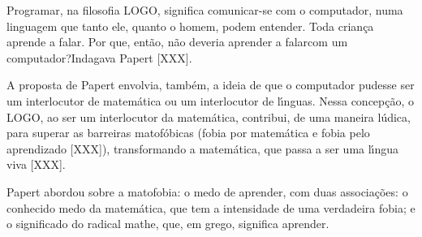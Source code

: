 \documentclass[
12pt,		%
openright,	%
twoside,  %
a4paper,			%
chapter=TITLE,		%
english,			%
french,				%
spanish,			%
brazil				%
]{USPSC-classe/USPSC_RedarTex}
\begin{document}
Programar, na filosofia LOGO, significa \textquotedbl comunicar-se com o computador, numa linguagem que tanto ele, quanto o homem,  podem entender\textquotedbl . Toda crian\c{c}a aprende a falar. Por que, ent\~ao, n\~ao deveria aprender a \textquotedbl falar\textquotedbl  com um computador?\textquotedbl  Indagava Papert [XXX].








A proposta de Papert envolvia, tamb\'em, a ideia de que o computador pudesse ser um interlocutor  de matem\'atica ou um interlocutor de l\'{\i}nguas. Nessa concep\c{c}\~ao, o LOGO, ao ser um interlocutor da matem\'atica, contribui, de uma maneira l\'udica, para superar as barreiras matof\'obicas (fobia por matem\'atica e fobia pelo aprendizado [XXX]), transformando a matem\'atica, que passa a ser uma l\'{\i}ngua viva [XXX].








Papert abordou sobre a \textquotedbl matofobia: o medo de aprender\textquotedbl , com duas associa\c{c}\~oes: o conhecido medo da matem\'atica, que tem a intensidade de uma verdadeira fobia; e o  significado do radical mathe, que, em grego, significa aprender.









\noindent\begin{center}\mbox{\centering{}}\end{center}
\end{document}
